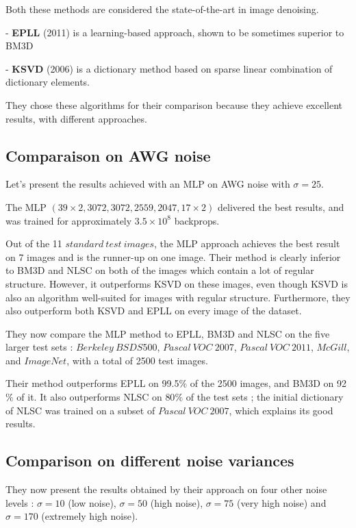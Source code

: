 \documentclass[10pt,a4paper]{article}
\newcommand{\svs}{\vspace{9pt}}
\begin{document}
\svs

Both these methods are considered the state-of-the-art in image denoising.

\svs

- \textbf{EPLL} (2011) is a learning-based approach, shown to be sometimes superior to BM3D

\svs

- \textbf{KSVD} (2006) is a dictionary method based on sparse linear combination of dictionary elements.

They chose these algorithms for their comparison because they achieve excellent results, with different approaches.

\subsection{Comparaison on AWG noise}

Let's present the results achieved with an MLP on AWG noise with $\sigma=25$.

\svs 

The MLP $(39 \times 2, 3072, 3072, 2559, 2047, 17 \times 2)$ delivered the best results, and was trained for approximately $3.5 \times 10^8$ backprops.

\svs 

Out of the 11 $standard\ test\ images$, the MLP approach achieves the best result on 7 images and is the runner-up on one image.
Their method is clearly inferior to BM3D and NLSC on both of the images which contain a lot of regular structure. However, it outperforms KSVD on these images, even though KSVD is also an algorithm well-suited for images with regular structure. Furthermore, they also outperform both KSVD and EPLL on every image of the dataset.

\svs

They now compare the MLP method to EPLL, BM3D and NLSC on the five larger test sets : $Berkeley\ BSDS500$, $Pascal\ VOC\ 2007$, $Pascal\ VOC\ 2011$, $McGill$, and $ImageNet$, with a total of 2500 test images.

\svs

Their method outperforms EPLL on 99.5$\%$ of the 2500 images, and BM3D on 92$\%$ of it. It also outperforms NLSC on 80$\%$ of the test sets ; the initial dictionary of NLSC was trained on a subset of $Pascal\ VOC\ 2007$, which explains its good results.

\subsection{Comparison on different noise variances}

They now present the results obtained by their approach on four other
noise levels : $\sigma = 10$ (low noise), $\sigma = 50$
(high noise), $\sigma = 75$ (very high noise) and $\sigma = 170$ (extremely high noise).

\printbibliography
\end{document}
